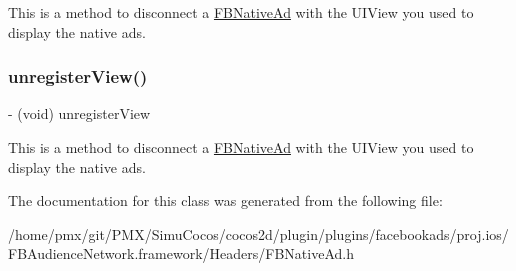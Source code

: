 This is a method to disconnect a \hyperlink{interfaceFBNativeAd}{F\+B\+Native\+Ad} with the U\+I\+View you used to display the native ads. \mbox{\label{interfaceFBNativeAd_af146b825ecd435d8e4de489f6b61dcc2}} 
\subsubsection{\texorpdfstring{unregister\+View()}{unregisterView()}\hspace{0.1cm}{\footnotesize\ttfamily [5/5]}}
{\footnotesize\ttfamily -\/ (void) unregister\+View \begin{DoxyParamCaption}{ }\end{DoxyParamCaption}}

This is a method to disconnect a \hyperlink{interfaceFBNativeAd}{F\+B\+Native\+Ad} with the U\+I\+View you used to display the native ads. 

The documentation for this class was generated from the following file\+:\begin{DoxyCompactItemize}
\item 
/home/pmx/git/\+P\+M\+X/\+Simu\+Cocos/cocos2d/plugin/plugins/facebookads/proj.\+ios/\+F\+B\+Audience\+Network.\+framework/\+Headers/F\+B\+Native\+Ad.\+h\end{DoxyCompactItemize}
